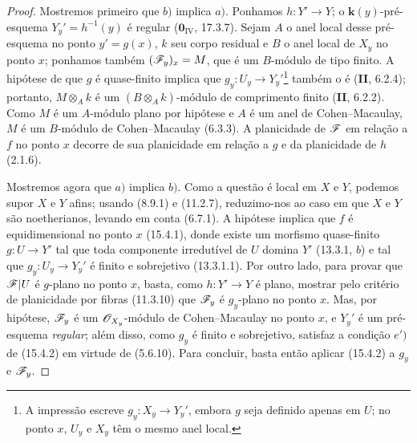 \begin{proof}
\label{IV.15.4.3-proof}
Mostremos primeiro que $b)$ implica $a)$. Ponhamos $h:Y'\to Y$; o $\mathbf{k}(y)$-pré-esquema $Y_y'=h^{-1}(y)$ é regular ($\mathbf{0}_{\mathrm{IV}}$, 17.3.7). Sejam $A$ o anel local desse pré-esquema no ponto $y'=g(x)$, $k$ seu corpo residual e $B$ o anel local de $X_y$ no ponto $x$; ponhamos também $(\mathscr{F}_y)_x=M$, que é um $B$-módulo de tipo finito. A hipótese de que $g$ é quase-finito implica que $g_y:U_y\to Y_y'$\footnote{A impressão escreve $g_y:X_y\to Y_y'$, embora $g$ seja definido apenas em $U$; no ponto $x$, $U_y$ e $X_y$ têm o mesmo anel local.} também o é (\textbf{II}, 6.2.4); portanto, $M\otimes_A k$ é um $(B\otimes_A k)$-módulo de comprimento finito (\textbf{II}, 6.2.2). Como $M$ é um $A$-módulo plano por hipótese e $A$ é um anel de Cohen--Macaulay, $M$ é um $B$-módulo de Cohen--Macaulay (6.3.3). A planicidade de $\mathscr{F}$ em relação a $f$ no ponto $x$ decorre de sua planicidade em relação a $g$ e da planicidade de $h$ (2.1.6).

Mostremos agora que $a)$ implica $b)$. Como a questão é local em $X$ e $Y$, podemos supor $X$ e $Y$ afins; usando (8.9.1) e (11.2.7), reduzimo-nos ao caso em que $X$ e $Y$ são noetherianos, levando em conta (6.7.1). A hipótese implica que $f$ é
equidimensional no ponto $x$ (15.4.1), donde existe um morfismo quase-finito $g:U\to Y'$ tal que toda componente irredutível de $U$ domina $Y'$ (13.3.1, $b$) e tal que $g_y:U_y\to Y_y'$ é finito e sobrejetivo (13.3.1.1). Por outro lado, para provar que $\mathscr{F}|U$ é $g$-plano no ponto $x$, basta, como $h:Y'\to Y$ é plano, mostrar pelo critério de planicidade por fibras (11.3.10) que $\mathscr{F}_y$ é $g_y$-plano no ponto $x$. Mas, por hipótese, $\mathscr{F}_y$ é um $\mathscr{O}_{X_y}$-módulo de Cohen--Macaulay no ponto $x$, e $Y_y'$ é um pré-esquema \emph{regular}; além disso, como $g_y$ é finito e sobrejetivo, satisfaz a condição $e')$ de (15.4.2) em virtude de (5.6.10). Para concluir, basta então aplicar (15.4.2) a $g_y$ e $\mathscr{F}_y$.
\end{proof}
